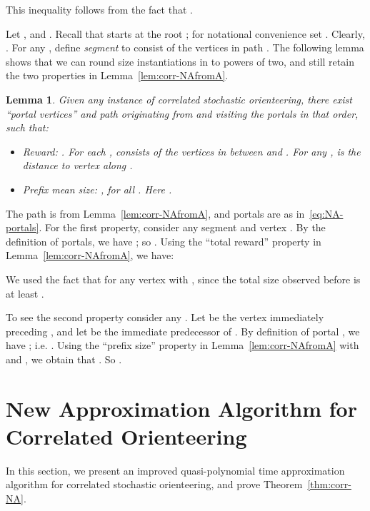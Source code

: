 \documentclass[11pt,letterpaper]{article}
\newtheorem{lemma}[theorem]{Lemma}
\numberwithin{algorithm}{section}
\newenvironment{proof}{

\noindent{\bf Proof:}}
{\hfill


}
\begin{document}
This inequality follows from the fact that .



Let , and .  
Recall that  starts at the root ; for notational convenience set . Clearly, .
For any , define {\em segment}  to consist of the vertices  in path . The following lemma shows that
we can round size instantiations in  to powers of two, and still retain the two properties in Lemma~\ref{lem:corr-NAfromA}.



\begin{lemma}\label{lem:corr-portals}
Given any instance of correlated stochastic orienteering, there exist ``portal vertices''  and path  originating from  and visiting the portals in that order, such that:
\begin{itemize}
\item Reward: . For each ,  consists of the vertices in  between  and . For any ,  is the distance to vertex  along .
\item Prefix mean size: , for all . Here .
\end{itemize}
\end{lemma}
\begin{proof}
The path  is from Lemma~\ref{lem:corr-NAfromA}, and portals  are as in~\eqref{eq:NA-portals}. For the first property, consider any segment  and vertex . By the definition of portals, we have ; so . Using the ``total reward'' property in Lemma~\ref{lem:corr-NAfromA}, we have:

We used the fact that for any vertex  with ,  since the total size observed before  is at least .

To see the second property consider any . Let  be the vertex immediately preceding , and let  be the immediate predecessor of . By definition of portal , we have ; i.e. . Using the ``prefix size'' property in Lemma~\ref{lem:corr-NAfromA} with  and , we obtain that . So .
\end{proof}

\section{New Approximation Algorithm for Correlated Orienteering} \label{sec:corr-alg}
In this section, we present an improved quasi-polynomial time approximation algorithm for correlated stochastic orienteering, and prove Theorem~\ref{thm:corr-NA}.
\end{document}
